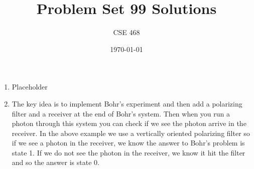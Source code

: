 \documentclass[12pt]{article}
\title{Problem Set 99 Solutions}
\author{CSE 468}
\date{\today}
\begin{document}
\maketitle

\begin{enumerate}[font=\bfseries]
    \item Placeholder
    \item The key idea is to implement Bohr’s experiment and then add a polarizing filter and a receiver at the end of Bohr’s system. Then when you run a photon through this system you can check if we see the photon arrive in the receiver. In the above example we use a vertically oriented polarizing filter so if we see a photon in the receiver, we know the answer to Bohr’s problem is state 1. If we do not see the photon in the receiver, we know it hit the filter and so the answer is state 0.
\end{enumerate}
\end{document}

